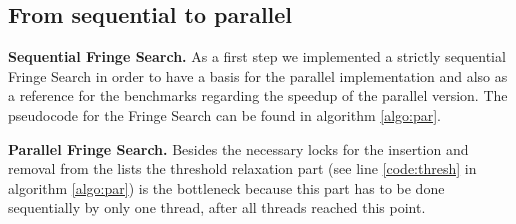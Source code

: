 \documentclass[letterpaper]{article}
\newcommand{\mypar}[1]{{\bf #1.}}
\begin{document}
\subsection{From sequential to parallel}\label{ssec:seqpar}

\mypar{Sequential Fringe Search}
As a first step we implemented a strictly sequential Fringe Search in order to have a basis for the parallel implementation and also as a reference for the benchmarks regarding the speedup of the parallel version. The pseudocode for the Fringe Search can be found in algorithm \ref{algo:par}.

\mypar{Parallel Fringe Search}
Besides the necessary locks for the insertion and removal from the lists the threshold relaxation part (see line \ref{code:thresh} in algorithm \ref{algo:par}) is the bottleneck because this part has to be done sequentially by only one thread, after all threads reached this point.
\end{document}
